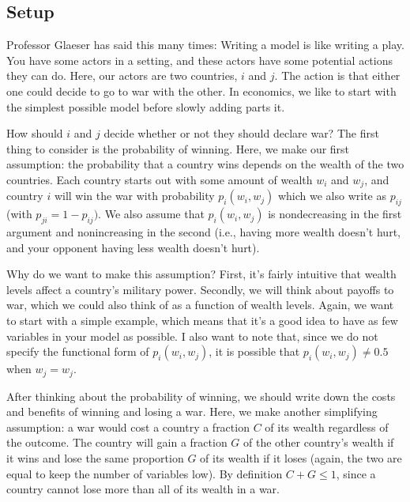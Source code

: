 \subsection*{Setup}
Professor Glaeser has said this many times: Writing a model is like writing a play. You have some actors in a setting, and these actors have some potential actions they can do. Here, our actors are two countries, $i$ and $j$. The action is that either one could decide to go to war with the other. In economics, we like to start with the simplest possible model before slowly adding parts it. 

How should $i$ and $j$ decide whether or not they should declare war? The first thing to consider is the probability of winning. Here, we make our first assumption: the probability that a country wins depends on the wealth of the two countries. Each country starts out with some amount of wealth $w_i$ and $w_j$, and country $i$ will win the war with probability $p_i(w_i,w_j)$ which we also write as $p_{ij}$ (with $p_{ji} = 1 - p_{ij})$. We also assume that $p_i(w_i,w_j)$ is nondecreasing in the first argument and nonincreasing in the second (i.e., having more wealth doesn't hurt, and your opponent having less wealth doesn't hurt). 

Why do we want to make this assumption? First, it's fairly intuitive that wealth levels affect a country's military power. Secondly, we will think about payoffs to war, which we could also think of as a function of wealth levels. Again, we want to start with a simple example, which means that it's a good idea to have as few variables in your model as possible. I also want to note that, since we do not specify the functional form of $p_i(w_i,w_j)$, it is possible that $p_i(w_i,w_j) \neq 0.5$ when $w_j = w_j$. 

After thinking about the probability of winning, we should write down the costs and benefits of winning and losing a war. Here, we make another simplifying assumption: a war would cost a country a fraction $C$ of its wealth regardless of the outcome. The country will gain a fraction $G$ of the other country's wealth if it wins and lose the same proportion $G$ of its wealth if it loses (again, the two are equal to keep the number of variables low). By definition $C + G \leq 1$, since a country cannot lose more than all of its wealth in a war. 

